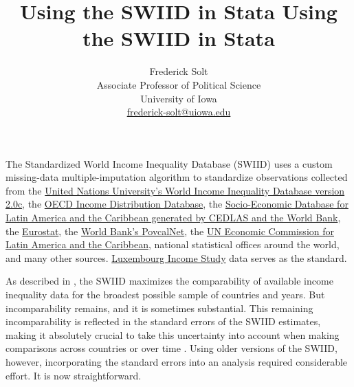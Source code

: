 \documentclass[11pt,]{article}
\title{Using the SWIID in Stata  }
\theoremstyle{definition}
\theoremstyle{definition}
\theoremstyle{remark}
\begin{document}
	
%

{\title{Using the SWIID in Stata}
	\author{
		Frederick Solt\\
		Associate Professor of Political Science\\
		University of Iowa\\
		\href{mailto:frederick-solt@uiowa.edu}{frederick-solt@uiowa.edu}}
	\date{}
	\maketitle}




\noindent \singlespacing The Standardized World Income Inequality Database (SWIID) uses a custom
missing-data multiple-imputation algorithm to standardize observations
collected from the
\href{http://www.wider.unu.edu/research/Database/}{United Nations
University's World Income Inequality Database version 2.0c}, the
\href{http://www.oecd.org/social/inequality.htm}{OECD Income
Distribution Database}, the
\href{http://sedlac.econo.unlp.edu.ar/eng/}{Socio-Economic Database for
Latin America and the Caribbean generated by CEDLAS and the World Bank},
the \href{http://epp.eurostat.ec.europa.eu}{Eurostat}, the
\href{http://iresearch.worldbank.org/PovcalNet/index.htm}{World Bank's
PovcalNet}, the
\href{http://interwp.cepal.org/sisgen/ConsultaIntegrada.asp?idIndicador=250\&idioma=e}{UN
Economic Commission for Latin America and the Caribbean}, national
statistical offices around the world, and many other sources.
\href{http://www.lisdatacenter.org}{Luxembourg Income Study} data serves
as the standard.

As described in \citet{Solt2016}, the SWIID maximizes the comparability
of available income inequality data for the broadest possible sample of
countries and years. But incomparability remains, and it is sometimes
substantial. This remaining incomparability is reflected in the standard
errors of the SWIID estimates, making it absolutely crucial to take this
uncertainty into account when making comparisons across countries or
over time
\citetext{\citealp[p.238]{Solt2009}; \citealp[p.14]{Solt2016}}. Using
older versions of the SWIID, however, incorporating the standard errors
into an analysis required considerable effort. It is now
straightforward.
\end{document}
